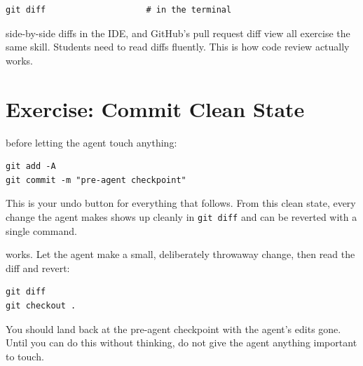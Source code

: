 \begin{verbatim}
git diff                    # in the terminal
\end{verbatim}

 side-by-side diffs in the IDE, and GitHub's pull
request diff view all exercise the same skill. Students need to read diffs fluently. This is how
code review actually works.


\newpage
\section{Exercise: Commit Clean State}

 before letting the agent touch anything:

\begin{verbatim}
git add -A
git commit -m "pre-agent checkpoint"
\end{verbatim}

This is your undo button for everything that follows. From this clean state, every change the
agent makes shows up cleanly in \texttt{git diff} and can be reverted with a single command.

 works. Let the agent make a small, deliberately throwaway
change, then read the diff and revert:

\begin{verbatim}
git diff
git checkout .
\end{verbatim}

You should land back at the pre-agent checkpoint with the agent's edits gone. Until you can do
this without thinking, do not give the agent anything important to touch.


\newpage

